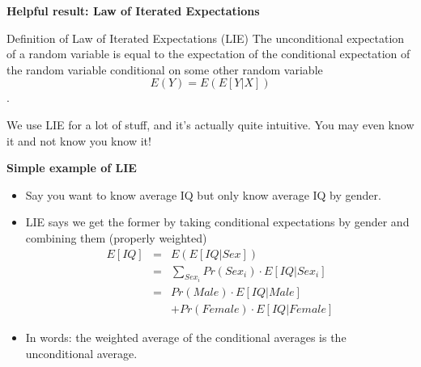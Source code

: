 \documentclass[notes=show]{beamer}
\begin{document}
\begin{frame}[plain]
	\begin{center}
	\textbf{Helpful result: Law of Iterated Expectations}
	\end{center}

	\begin{block}{Definition of Law of Iterated Expectations (LIE)}
	The unconditional expectation of a random variable is equal to the expectation of the conditional expectation of the random variable conditional on some other random variable $$E(Y) = E(E[Y|X])$$.
	\end{block}
We use LIE for a lot of stuff, and it's actually quite intuitive. You may even know it and not know you know it!
	

\end{frame}

\begin{frame}[plain]
\begin{center}
\textbf{Simple example of LIE}
\end{center}

	\begin{itemize}
	\item Say you want to know average IQ but only know average IQ by gender.  
	\item LIE says we get the former by taking conditional expectations by gender and combining them (properly weighted)
		\begin{eqnarray*}
		E[IQ] &=& E(E[IQ|Sex]) \\
		&=& \sum_{Sex_i}Pr(Sex_i)\cdot E[IQ | Sex_i]\\
		&=& Pr(Male) \cdot E[IQ | Male] \\
			&&+ Pr(Female) \cdot E[IQ | Female]
		\end{eqnarray*}
	\item In words: the weighted average of the conditional averages is the unconditional average.
	\end{itemize}
\end{frame}
\end{document}
